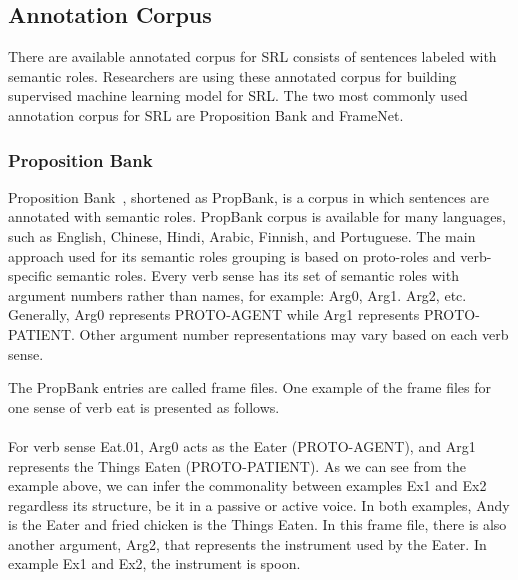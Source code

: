 \subsection{Annotation Corpus}
There are available annotated corpus for SRL consists of sentences labeled with semantic roles. Researchers are using these annotated corpus for building supervised machine learning model for SRL. The two most commonly used annotation corpus for SRL are Proposition Bank and FrameNet.

\subsubsection{Proposition Bank}
Proposition Bank~\citep{kingsbury2002treebank}, shortened as PropBank, is a corpus in which sentences are annotated with semantic roles. PropBank corpus is available for many languages, such as English, Chinese, Hindi, Arabic, Finnish, and Portuguese. The main approach used for its semantic roles grouping is based on proto-roles and verb-specific semantic roles. Every verb sense has its set of semantic roles with argument numbers rather than names, for example: Arg0, Arg1. Arg2, etc. Generally, Arg0 represents PROTO-AGENT while Arg1 represents PROTO-PATIENT. Other argument number representations may vary based on each verb sense.

The PropBank entries are called frame files. One example of the frame files for one sense of verb eat is presented as follows.
\\
\\

For verb sense Eat.01, Arg0 acts as the Eater (PROTO-AGENT), and Arg1 represents the Things Eaten (PROTO-PATIENT). As we can see from the example above, we can infer the commonality between examples Ex1 and Ex2 regardless its structure, be it in a passive or active voice. In both examples, Andy is the Eater and fried chicken is the Things Eaten. In this frame file, there is also another argument, Arg2, that represents the instrument used by the Eater. In example Ex1 and Ex2, the instrument is spoon.


